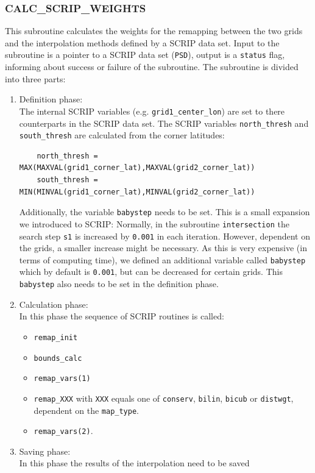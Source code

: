 \documentclass[11pt,twoside]{article}
\begin{document}
\subsubsection{CALC\_SCRIP\_WEIGHTS\label{CALCWEIGHTS}}
This subroutine calculates the weights for the remapping between
the two grids and the interpolation methods defined by a SCRIP data
set. Input to the subroutine is a pointer to a SCRIP data set
(\verb|PSD|), output is a \verb|status| flag, informing about success
or failure of the subroutine.
The subroutine is divided into three parts:
\begin{enumerate}
\item Definition phase: \\
The internal SCRIP variables (e.g. \verb|grid1_center_lon|) are set to
there counterparts in the SCRIP data set. The SCRIP
variables \verb|north_thresh| and \verb|south_thresh| are calculated
from the corner latitudes:
\begin{verbatim}
    north_thresh = MAX(MAXVAL(grid1_corner_lat),MAXVAL(grid2_corner_lat))
    south_thresh = MIN(MINVAL(grid1_corner_lat),MINVAL(grid2_corner_lat))
\end{verbatim}
Additionally, the variable \verb|babystep| needs to be set. This is a
small expansion we introduced to SCRIP:
Normally, in the subroutine \verb|intersection| the search
step \verb|s1| is increased by \verb|0.001| in each iteration.
 However, dependent on the
grids,  a smaller increase might be necessary. As this 
is very expensive (in terms of computing time),  we
defined an additional variable called \verb|babystep| which by default
is \verb|0.001|, but can be decreased for certain grids.
This \verb|babystep| also needs to be set in the definition phase.
\item Calculation phase: \\
In this phase the sequence of SCRIP routines is called:
\begin{itemize}
\item \verb|remap_init|
\item \verb|bounds_calc|
\item \verb|remap_vars(1)|
\item \verb|remap_XXX| with \verb|XXX| equals one
of \verb|conserv|, \verb|bilin|, \verb|bicub| or \verb|distwgt|,
dependent on the \verb|map_type|.
\item \verb|remap_vars(2)|.
\end{itemize}
\item Saving phase: \\
In this phase the results of the interpolation need to be saved

\end{enumerate}
\end{document}
